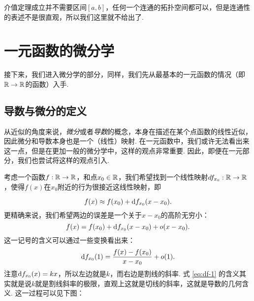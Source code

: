 介值定理成立并不需要区间$[a,b]$，任何一个连通的拓扑空间都可以，但是连通性的表述不是很直观，所以我们这里就不给出了. 


\section{一元函数的微分学}

接下来，我们进入微分学的部分，同样，我们先从最基本的一元函数的情况（即$\mathbb{R}\to\mathbb{R}$的函数）入手. 

\subsection{导数与微分的定义}

从近似的角度来说，\emph{微分}或者\emph{导数}的概念，本身在描述在某个点函数的线性近似，因此微分和导数本身也是一个（线性）映射. 在一元函数中，我们或许无法看出来这一点，但是在更加一般的微分学中，这样的观点非常重要. 因此，即便在一元部分，我们也尝试将这样的观点引入. 

考虑一个函数$f:\mathbb{R}\to\mathbb{R}$，和点$x_0\in\mathbb{R}$，我们希望找到一个线性映射$df_{x_0}:\mathbb{R}\to\mathbb{R}$，使得$f(x)$在$x_0$附近的行为很接近这线性映射，即

\[
    f(x)\approx f(x_0)+\mathrm{d} f_{x_0}(x-x_0).
\]
更精确来说，我们希望两边的误差是一个关于$x-x_0$的高阶无穷小：
\[
    f(x)=f(x_0)+\mathrm{d} f_{x_0}(x-x_0)+o(x-x_0).
\]
这一记号的含义可以通过一些变换看出来：
\begin{equation}
\mathrm{d} f_{x_0}(1)=\frac{f(x)-f(x_0)}{x-x_0}+o(1).\label{eq:df-1}
\end{equation}
注意$\mathrm{d} f_{x_0}(x)=kx$，所以左边就是$k$，而右边是割线的斜率. 式 \eqref{eq:df-1} 的含义其实就是说$k$就是割线斜率的极限，直观上这就是切线的斜率，这就是导数的几何含义. 这一过程可以见下图：

\begin{center}
\end{center}

